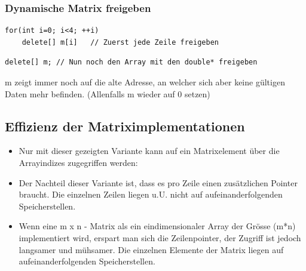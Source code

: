 \subsubsection{Dynamische Matrix freigeben}
\noindent
\begin{minipage}{0.6\linewidth}
\begin{lstlisting}
for(int i=0; i<4; ++i)
	delete[] m[i]	// Zuerst jede Zeile freigeben		
\end{lstlisting}
\end{minipage}
\begin{figure}[hh]
	
	\hspace{0.1\linewidth}
	
\end{figure}
\vspace{\baselineskip}
\noindent
\begin{minipage}{\linewidth}
\begin{lstlisting}
delete[] m;	// Nun noch den Array mit den double* freigeben
\end{lstlisting}
\end{minipage}
\begin{figure}[hh]
	
	\hspace{0.1\linewidth}
	
\end{figure}
\vspace{\baselineskip}
\begin{achtung}
m zeigt immer noch auf die alte Adresse, an welcher sich aber keine gültigen Daten mehr befinden. (Allenfalls m wieder auf 0 setzen)
\end{achtung}

\subsection{Effizienz der Matriximplementationen}
\begin{itemize}
	\item Nur mit dieser gezeigten Variante kann auf ein Matrixelement über die Arrayindizes zugegriffen werden:
	\item Der Nachteil dieser Variante ist, dass es pro Zeile einen zusätzlichen Pointer braucht. Die einzelnen Zeilen liegen u.U. nicht auf aufeinanderfolgenden Speicherstellen.
	\item Wenn eine m x n - Matrix als ein eindimensionaler Array der Grösse (m*n) implementiert wird, erspart man sich die Zeilenpointer, der Zugriff ist jedoch langsamer und mühsamer. Die einzelnen Elemente der Matrix liegen auf aufeinanderfolgenden Speicherstellen.
\end{itemize}